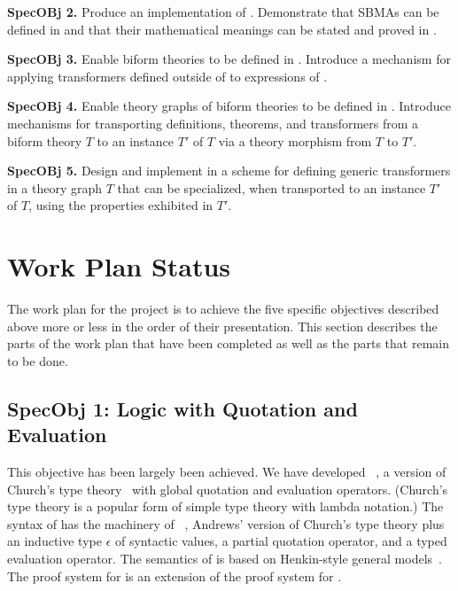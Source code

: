 \documentclass[fleqn]{llncs}
\begin{document}
\medskip

  \item[]\textbf{SpecOBj 2.} Produce an implementation  of
    .  Demonstrate that SBMAs can be defined in
     and that their mathematical meanings can be stated
    and proved in .

\medskip

  \item[]\textbf{SpecOBj 3.} Enable biform theories to be defined in
    .  Introduce a mechanism for applying transformers
    defined outside of  to expressions of .

\medskip

  \item[]\textbf{SpecOBj 4.} Enable theory graphs of biform theories
    to be defined in .  Introduce mechanisms for
    transporting definitions, theorems, and transformers from a biform
    theory $T$ to an instance $T'$ of $T$ via a theory morphism from
    $T$ to $T'$.

\medskip

  \item[]\textbf{SpecOBj 5.} Design and implement in  a
    scheme for defining generic transformers in a theory graph $T$
    that can be specialized, when transported to an instance $T'$ of
    $T$, using the properties exhibited in $T'$.

\ei


\section{Work Plan Status}

The work plan for the project is to achieve the five specific
objectives described above more or less in the order of their
presentation.  This section describes the parts of the work plan that
have been completed as well as the parts that remain to be done.

\subsection*{SpecObj 1: Logic with Quotation and Evaluation}

This objective has been largely been achieved.  We have developed
{\churchqe}~\cite{Farmer18}, a version of Church's type
theory~\cite{Church40} with global quotation and evaluation operators.
(Church's type theory is a popular form of simple type theory with
lambda notation.)  The syntax of {\churchqe} has the machinery of
{\qzero}~\cite{Andrews02}, Andrews' version of Church's type theory
plus an inductive type $\epsilon$ of syntactic values, a partial
quotation operator, and a typed evaluation operator.  The semantics of
{\churchqe} is based on Henkin-style general models~\cite{Henkin50}.
The proof system for {\churchqe} is an extension of the proof system
for {\qzero}.
\end{document}
